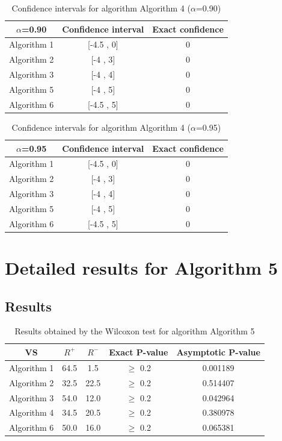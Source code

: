 \documentclass[a4paper,10pt]{article}
\begin{document}
\begin{table}[!htp]
\centering\small
\begin{tabular}{
|c|c|c|}
\hline
 $\alpha$=0.90 & Confidence interval & Exact confidence \\ \hline 
Algorithm 1 & [-4.5 , 0] & 0\\ \hline 
Algorithm 2 & [-4 , 3] & 0\\ \hline 
Algorithm 3 & [-4 , 4] & 0\\ \hline 
Algorithm 5 & [-4 , 5] & 0\\ \hline 
Algorithm 6 & [-4.5 , 5] & 0\\ \hline 

\end{tabular}
\caption{Confidence intervals for algorithm Algorithm 4 ($\alpha$=0.90)}
\end{table}
\begin{table}[!htp]
\centering\small
\begin{tabular}{
|c|c|c|}
\hline
 $\alpha$=0.95 & Confidence interval & Exact confidence \\ \hline 
Algorithm 1 & [-4.5 , 0] & 0\\ \hline 
Algorithm 2 & [-4 , 3] & 0\\ \hline 
Algorithm 3 & [-4 , 4] & 0\\ \hline 
Algorithm 5 & [-4 , 5] & 0\\ \hline 
Algorithm 6 & [-4.5 , 5] & 0\\ \hline 

\end{tabular}
\caption{Confidence intervals for algorithm Algorithm 4 ($\alpha$=0.95)}
\end{table}

 \clearpage 


\section{Detailed results for Algorithm 5}


\subsection{Results}

\begin{table}[!htp]
\centering\small
\begin{tabular}{
|c|c|c|c|c|}
\hline
 VS & $R^{+}$ & $R^{-}$ & Exact P-value & Asymptotic P-value \\ \hline 
Algorithm 1 & 64.5 & 1.5 & $\geq$ 0.2 & 0.001189\\ \hline 
Algorithm 2 & 32.5 & 22.5 & $\geq$ 0.2 & 0.514407\\ \hline 
Algorithm 3 & 54.0 & 12.0 & $\geq$ 0.2 & 0.042964\\ \hline 
Algorithm 4 & 34.5 & 20.5 & $\geq$ 0.2 & 0.380978\\ \hline 
Algorithm 6 & 50.0 & 16.0 & $\geq$ 0.2 & 0.065381\\ \hline 

\end{tabular}
\caption{Results obtained by the Wilcoxon test for algorithm Algorithm 5}
\end{table}
\end{document}
